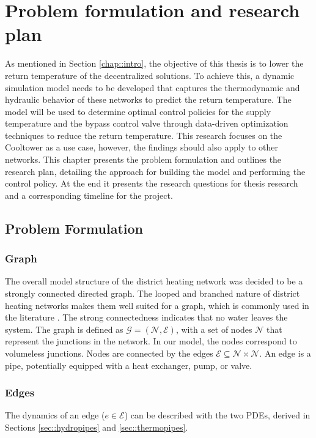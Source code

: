 \chapter{Problem formulation and research plan}\label{chap::PoA}
As mentioned in Section \ref{chap::intro}, the objective of this thesis is to lower the return temperature of the decentralized solutions. To achieve this, a dynamic simulation model needs to be developed that captures the thermodynamic and hydraulic behavior of these networks to predict the return temperature. The model will be used to determine optimal control policies for the supply temperature and the bypass control valve through data-driven optimization techniques to reduce the return temperature. This research focuses on the Cooltower as a use case, however, the findings should also apply to other networks. This chapter presents the problem formulation and outlines the research plan, detailing the approach for building the model and performing the control policy. At the end it presents the research questions for thesis research and a corresponding timeline for the project. 

\section{Problem Formulation} 
\subsection{Graph}
The overall model structure of the district heating network was decided to be a strongly connected directed graph. The looped and branched nature of district heating networks makes them well suited for a graph, which is commonly used in the literature \cite{sibeijn2025economic, Krug2020,OPPELT2016336,Simonssongraph}. The strong connectedness indicates that no water leaves the system. The graph is defined as $\mathcal{G}=(\mathcal{N}, \mathcal{E})$, with a set of nodes $\mathcal{N}$ that represent the junctions in the network. In our model, the nodes correspond to volumeless junctions. Nodes are connected by the edges $\mathcal{E} \subseteq \mathcal{N} \times \mathcal{N}$. An edge is a pipe, potentially equipped with a heat exchanger, pump, or valve. 

\subsection{Edges}
The dynamics of an edge ($e \in \mathcal{E}$) can be described with the two PDEs, derived in Sections \ref{sec::hydropipes} and \ref{sec::thermopipes}.

